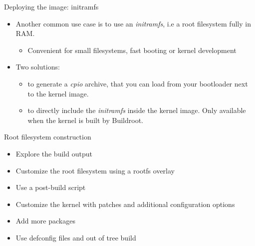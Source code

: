 \begin{frame}{Deploying the image: initramfs}
  \begin{itemize}

  \item Another common use case is to use an {\em initramfs}, i.e a
    root filesystem fully in RAM.
    \begin{itemize}
    \item Convenient for small filesystems, fast booting or kernel
      development
    \end{itemize}
  \item Two solutions:
    \begin{itemize}
    \item {} to generate a {\em cpio}
      archive, that you can load from your bootloader next to the
      kernel image.
    \item {} to directly include the
      {\em initramfs} inside the kernel image. Only available when the
      kernel is built by Buildroot.
    \end{itemize}
  \end{itemize}
\end{frame}

\setuplabframe
{Root filesystem construction}
{
  \begin{itemize}
  \item Explore the build output
  \item Customize the root filesystem using a rootfs overlay
  \item Use a post-build script
  \item Customize the kernel with patches and additional configuration
    options
  \item Add more packages
  \item Use defconfig files and out of tree build
  \end{itemize}
}
